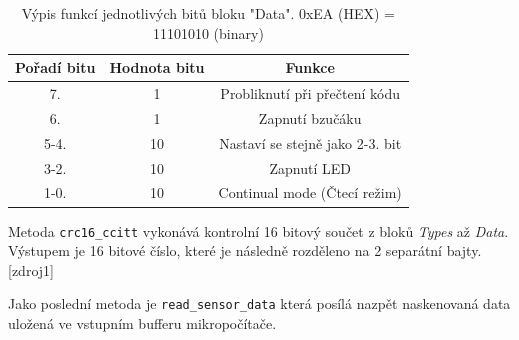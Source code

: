 \begin{table}[H]
    \centering
    \begin{tabular}{|c|c|c|}
         \hline
         Pořadí bitu & Hodnota bitu & Funkce \\ \hline
         7. & 1 & Probliknutí při přečtení kódu \\ \hline
         6. & 1 & Zapnutí bzučáku \\ \hline
         5-4. & 10 & Nastaví se stejně jako 2-3. bit \\ \hline
         3-2. & 10 & Zapnutí LED \\ \hline
         1-0. & 10 & Continual mode (Čtecí režim)\\ \hline
    \end{tabular}
    \caption{Výpis funkcí jednotlivých bitů bloku "Data". 0xEA (HEX) = 11101010 (binary)}
    \label{tab:my_label}
\end{table}

%
%
%           
%
\bigskip
Metoda \texttt{crc16\_ccitt} vykonává kontrolní 16 bitový součet z bloků \textit{Types} až \textit{Data}. Výstupem je 16 bitové číslo, které je následně rozděleno na 2 separátní bajty.[zdroj1]

%
\bigskip
Jako poslední metoda je \texttt{read\_sensor\_data} která posílá nazpět naskenovaná data uložená ve vstupním bufferu mikropočítače.
%

